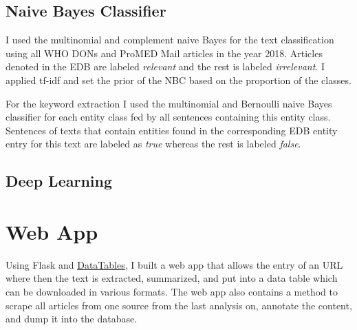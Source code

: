 \subsection{Naive Bayes Classifier}
I used the multinomial and complement naive Bayes for the text classification using all WHO DONs and ProMED Mail articles in the year 2018. Articles denoted in the EDB are labeled \emph{relevant} and the rest is labeled \emph{irrelevant}. I applied tf-idf and set the prior of the NBC based on the proportion of the classes.

 For the keyword extraction I used the multinomial and Bernoulli naive Bayes classifier for each entity class fed by all sentences containing this entity class. Sentences of texts that contain entities found in the corresponding EDB entity entry for this text are labeled as \emph{true} whereas the rest is labeled \emph{false}.

\subsection{Deep Learning}

\section{Web App}
Using Flask and \href{https://www.datatables.net}{DataTables}, I built a web app that allows the entry of an URL where then the text is extracted, summarized, and put into a data table which can be downloaded in various formats.
The web app also contains a method to scrape all articles from one source from the last analysis on, annotate the content, and dump it into the database.
